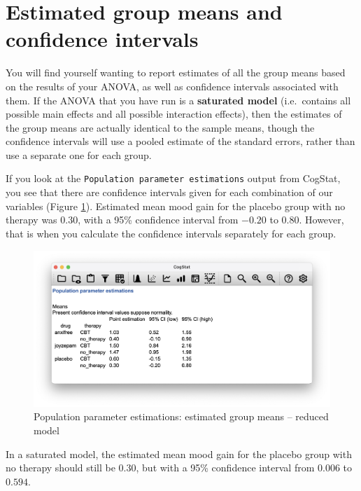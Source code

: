 \documentclass[
  11pt,
  a4paper,
  twoside,symmetric,openright]{book}
\theoremstyle{break}
\theoremstyle{break}
\begin{document}
\section{Estimated group means and confidence intervals}\label{meansfactorialanova}

You will find yourself wanting to report estimates of all the group means based on the results of your ANOVA, as well as confidence intervals associated with them. If the ANOVA that you have run is a \textbf{saturated model} (i.e.~contains all possible main effects and all possible interaction effects), then the estimates of the group means are actually identical to the sample means, though the confidence intervals will use a pooled estimate of the standard errors, rather than use a separate one for each group.

If you look at the \texttt{Population\ parameter\ estimations} output from CogStat, you see that there are confidence intervals given for each combination of our variables (Figure \ref{fig:cogstatafci}). Estimated mean mood gain for the placebo group with no therapy was \(0.30\), with a 95\% confidence interval from \(-0.20\) to \(0.80\). However, that is when you calculate the confidence intervals separately for each group.

\begin{figure}

{\centering \includegraphics[width=0.6\linewidth]{resources/image/cogstatafci} 

}

\caption{Population parameter estimations: estimated group means -- reduced model}\label{fig:cogstatafci}
\end{figure}

In a saturated model, the estimated mean mood gain for the placebo group with no therapy should still be \(0.30\), but with a 95\% confidence interval from \(0.006\) to \(0.594\).
\end{document}
